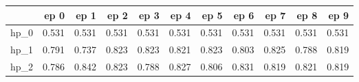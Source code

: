 \begin{tabular}{lrrrrrrrrrr}
\toprule
{} &   ep 0 &   ep 1 &   ep 2 &   ep 3 &   ep 4 &   ep 5 &   ep 6 &   ep 7 &   ep 8 &   ep 9 \\
\midrule
hp\_0 &  0.531 &  0.531 &  0.531 &  0.531 &  0.531 &  0.531 &  0.531 &  0.531 &  0.531 &  0.531 \\
hp\_1 &  0.791 &  0.737 &  0.823 &  0.823 &  0.821 &  0.823 &  0.803 &  0.825 &  0.788 &  0.819 \\
hp\_2 &  0.786 &  0.842 &  0.823 &  0.788 &  0.827 &  0.806 &  0.831 &  0.819 &  0.821 &  0.819 \\
\bottomrule
\end{tabular}
